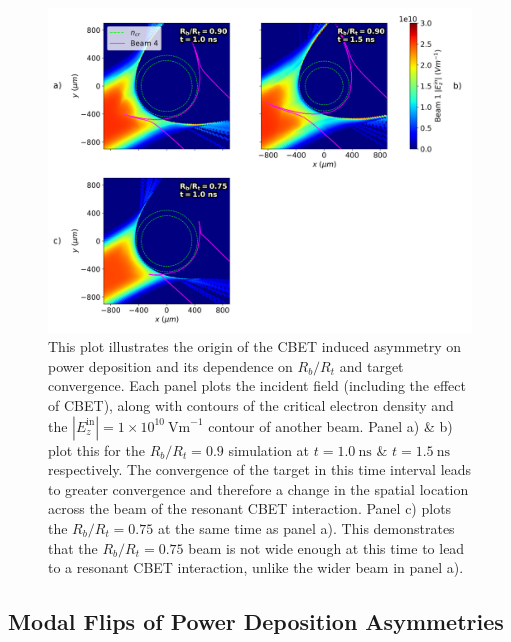 \begin{figure}[t!]
    \includegraphics[width=\linewidth]{Results1/Images/Field_profiles.png}
    \centering
    \caption{This plot illustrates the origin of the \ac{CBET} induced asymmetry on power deposition and its dependence on $R_b/R_t$ and target convergence.
    Each panel plots the incident field (including the effect of \ac{CBET}), along with contours of the critical electron density and the $|E_z^{\text{in}}|=1\times10^{10}\ \text{Vm}^{-1}$ contour of another beam.
    Panel a) \& b) plot this for the $R_b/R_t=0.9$ simulation at $t=1.0\ \text{ns}$ \& $t=1.5\ \text{ns}$ respectively.
    The convergence of the target in this time interval leads to greater convergence and therefore a change in the spatial location across the beam of the resonant \ac{CBET} interaction.
    Panel c) plots the $R_b/R_t=0.75$ at the same time as panel a).
    This demonstrates that the $R_b/R_t=0.75$ beam is not wide enough at this time to lead to a resonant \ac{CBET} interaction, unlike the wider beam in panel a).}%
    \label{fig:Res1_field_profiles}
\end{figure}


\subsection{Modal Flips of Power Deposition Asymmetries}%
\label{sec:Res1_ModalFlip}

